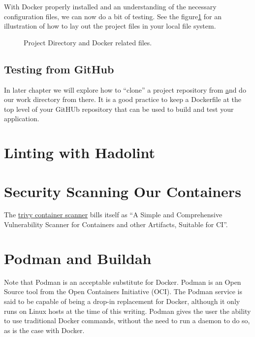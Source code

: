 \justify{}
With Docker properly installed and an understanding of the necessary configuration files, we can now do a bit of testing.
See the figure\ref{dockerdirectory} for an illustration of how to lay out the project files in your local file system.

\begin{figure}[!htb]
  \centering
  
  \caption{Project Directory and Docker related files.}
\label{dockerdirectory}
\end{figure}


\subsection{Testing from GitHub}
\justify{}
In later chapter we will explore how to ``clone'' a project repository from \href{github.com} and do our work directory
from there. It is a good practice to keep a Dockerfile at the top level of your GitHUb repository that can be used to
build and test your application.

\section{Linting with Hadolint}

\section{Security Scanning Our Containers}
The \href{https://github.com/aquasecurity/trivy}{trivy container scanner} bills itself
as ``A Simple and Comprehensive Vulnerability Scanner for Containers and other
Artifacts, Suitable for CI''.


\section{Podman and Buildah}

\justify{}
Note that Podman is an acceptable substitute for Docker.
Podman is an Open Source tool from the Open
Containers Initiative (OCI). The Podman service is said to be capable
of being a drop-in replacement for Docker, although it only
runs on Linux hosts at the time of this writing. Podman gives
the user the ability to use traditional Docker commands,
without the need to run a daemon to do so\cite{podman}, as is
the case with Docker.

